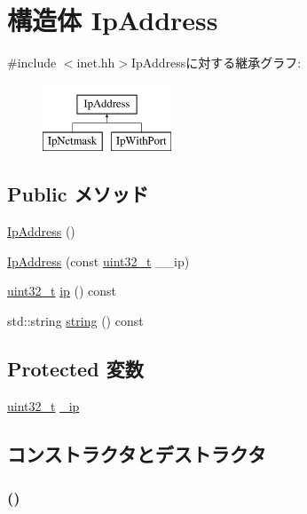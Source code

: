 \hypertarget{structNet_1_1IpAddress}{
\section{構造体 IpAddress}
\label{structNet_1_1IpAddress}
}


{\ttfamily \#include $<$inet.hh$>$}IpAddressに対する継承グラフ:\begin{figure}[H]
\begin{center}
\leavevmode
\includegraphics[height=2cm]{structNet_1_1IpAddress}
\end{center}
\end{figure}
\subsection*{Public メソッド}
\begin{DoxyCompactItemize}
\item 
\hyperlink{structNet_1_1IpAddress_a48835bc26cbd293cbae0e69671e5b5c2}{IpAddress} ()
\item 
\hyperlink{structNet_1_1IpAddress_ac64c29f95fc85f030281b767a3ba1815}{IpAddress} (const \hyperlink{Type_8hh_a435d1572bf3f880d55459d9805097f62}{uint32\_\-t} \_\-\_\-ip)
\item 
\hyperlink{Type_8hh_a435d1572bf3f880d55459d9805097f62}{uint32\_\-t} \hyperlink{structNet_1_1IpAddress_aa1d8477a72711a88f69e5fbac840c143}{ip} () const 
\item 
std::string \hyperlink{structNet_1_1IpAddress_a14a0e4fdb44bd7be64a3c6e5d94f8f0e}{string} () const 
\end{DoxyCompactItemize}
\subsection*{Protected 変数}
\begin{DoxyCompactItemize}
\item 
\hyperlink{Type_8hh_a435d1572bf3f880d55459d9805097f62}{uint32\_\-t} \hyperlink{structNet_1_1IpAddress_a87153b713af02b56e608fc9b7257f681}{\_\-ip}
\end{DoxyCompactItemize}


\subsection{コンストラクタとデストラクタ}
\hypertarget{structNet_1_1IpAddress_a48835bc26cbd293cbae0e69671e5b5c2}{
\subsubsection[{IpAddress}]{ ()}}
\label{structNet_1_1IpAddress_a48835bc26cbd293cbae0e69671e5b5c2}



